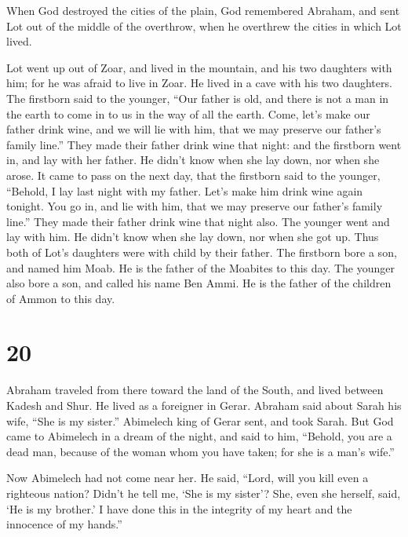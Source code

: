  When God destroyed the cities of the plain, God remembered
Abraham, and sent Lot out of the middle of the overthrow, when he
overthrew the cities in which Lot lived.

 Lot went up out of Zoar, and lived in the mountain, and
his two daughters with him; for he was afraid to live in Zoar. He lived
in a cave with his two daughters.  The firstborn said to
the younger, ``Our father is old, and there is not a man in the earth to
come in to us in the way of all the earth.  Come, let's
make our father drink wine, and we will lie with him, that we may
preserve our father's family line.''  They made their
father drink wine that night: and the firstborn went in, and lay with
her father. He didn't know when she lay down, nor when she arose.
 It came to pass on the next day, that the firstborn said
to the younger, ``Behold, I lay last night with my father. Let's make
him drink wine again tonight. You go in, and lie with him, that we may
preserve our father's family line.''  They made their
father drink wine that night also. The younger went and lay with him. He
didn't know when she lay down, nor when she got up.  Thus
both of Lot's daughters were with child by their father. 
The firstborn bore a son, and named him Moab. He is the father of the
Moabites to this day.  The younger also bore a son, and
called his name Ben Ammi. He is the father of the children of Ammon to
this day.

\hypertarget{section-19}{%
\section{20}\label{section-19}}

 Abraham traveled from there toward the land of the South,
and lived between Kadesh and Shur. He lived as a foreigner in Gerar.
 Abraham said about Sarah his wife, ``She is my sister.''
Abimelech king of Gerar sent, and took Sarah.  But God came
to Abimelech in a dream of the night, and said to him, ``Behold, you are
a dead man, because of the woman whom you have taken; for she is a man's
wife.''

 Now Abimelech had not come near her. He said, ``Lord, will
you kill even a righteous nation?  Didn't he tell me, `She
is my sister'? She, even she herself, said, `He is my brother.' I have
done this in the integrity of my heart and the innocence of my hands.''


